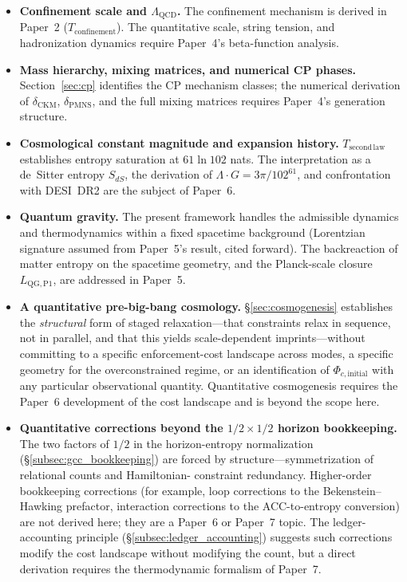 \documentclass[11pt]{article}
\newenvironment{varlist}{\begin{itemize}[nosep,leftmargin=2em]}{\end{itemize}}
\begin{document}
\begin{varlist}
  \item \textbf{Confinement scale and $\Lambda_{\mathrm{QCD}}$.}  The
    confinement mechanism is derived in Paper~2 ($T_{\mathrm{confinement}}$).
    The quantitative scale, string tension, and hadronization dynamics require
    Paper~4's beta-function analysis.

  \item \textbf{Mass hierarchy, mixing matrices, and numerical CP phases.}
    Section~\ref{sec:cp} identifies the CP mechanism classes; the numerical
    derivation of $\delta_{\mathrm{CKM}}$, $\delta_{\mathrm{PMNS}}$, and the
    full mixing matrices requires Paper~4's generation structure.

  \item \textbf{Cosmological constant magnitude and expansion history.}
    $T_{\mathrm{second\,law}}$ establishes entropy saturation at $61\ln 102$
    nats.  The interpretation as a de~Sitter entropy $S_{dS}$, the derivation
    of $\Lambda\cdot G = 3\pi/102^{61}$, and confrontation with DESI~DR2 are
    the subject of Paper~6.

  \item \textbf{Quantum gravity.}  The present framework handles the
    admissible dynamics and thermodynamics within a fixed spacetime background
    (Lorentzian signature assumed from Paper~5's result, cited forward).  The
    backreaction of matter entropy on the spacetime geometry, and the
    Planck-scale closure $L_{\mathrm{QG,P1}}$, are addressed in Paper~5.

  \item \textbf{A quantitative pre-big-bang cosmology.}
    \S\ref{sec:cosmogenesis} establishes the \emph{structural} form of
    staged relaxation---that constraints relax in sequence, not in parallel,
    and that this yields scale-dependent imprints---without committing to a
    specific enforcement-cost landscape across modes, a specific geometry
    for the overconstrained regime, or an identification of
    $\Phi_{c,\mathrm{initial}}$ with any particular observational quantity.
    Quantitative cosmogenesis requires the Paper~6 development of the cost
    landscape and is beyond the scope here.

  \item \textbf{Quantitative corrections beyond the $1/2\times 1/2$ horizon
    bookkeeping.}  The two factors of $1/2$ in the horizon-entropy
    normalization (\S\ref{subsec:gcc_bookkeeping}) are forced by
    structure---symmetrization of relational counts and Hamiltonian-
    constraint redundancy.  Higher-order bookkeeping corrections (for
    example, loop corrections to the Bekenstein--Hawking prefactor,
    interaction corrections to the ACC-to-entropy conversion) are not
    derived here; they are a Paper~6 or Paper~7 topic.  The ledger-
    accounting principle (\S\ref{subsec:ledger_accounting}) suggests such
    corrections modify the cost landscape without modifying the count,
    but a direct derivation requires the thermodynamic formalism of
    Paper~7.
\end{varlist}
\end{document}
